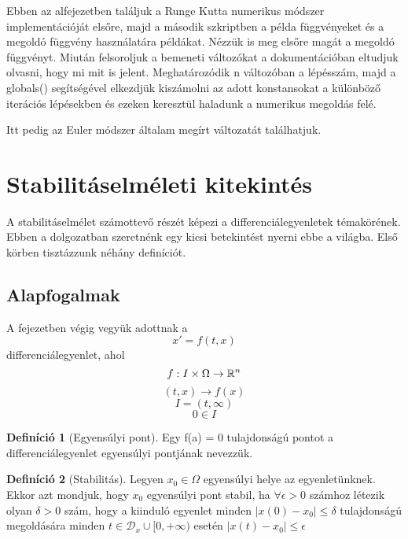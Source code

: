 \documentclass{article}
\theoremstyle{definition}
\theoremstyle{theorem}
\newtheorem{definition}{Definíció}
\begin{document}
Ebben az alfejezetben találjuk a Runge Kutta numerikus módszer implementációját elsőre, majd a második szkriptben a példa függvényeket és a megoldó függvény használatára példákat. Nézzük is meg elsőre magát a megoldó függvényt. Miután felsoroljuk a bemeneti változókat a dokumentációban eltudjuk olvasni, hogy mi mit is jelent. Meghatározódik n változóban a lépésszám, majd a globals() segítségével elkezdjük kiszámolni az adott konstansokat a különböző iterációs lépésekben és ezeken keresztül haladunk a numerikus megoldás felé.
\pagebreak



\pagebreak
Itt pedig az Euler módszer általam megírt változatát találhatjuk.

\section{Stabilitáselméleti kitekintés}
A stabilitáselmélet számottevő részét képezi a differenciálegyenletek témakörének. Ebben a dolgozatban szeretnénk egy kicsi betekintést nyerni ebbe a világba. Első körben tisztázzunk néhány definíciót.
\subsection{Alapfogalmak}
A fejezetben végig vegyük adottnak a
\begin{equation*}
    x' = f(t,x)
\end{equation*}
differenciálegyenlet, ahol
\begin{equation*}
    f: I \times \Omega \rightarrow \mathbb{R}^n \\
\end{equation*}
\begin{equation*}
    (t,x) \rightarrow f(x)
\end{equation*}
\begin{equation*}
    I=(t,\infty)
\end{equation*}
\begin{equation*}
    0 \in I
\end{equation*}
\begin{definition}[Egyensúlyi pont]
Egy f(a) = 0 tulajdonságú pontot a differenciálegyenlet egyensúlyi pontjának nevezzük.
\end{definition}
\begin{definition}[Stabilitás]
Legyen $x_0 \in \Omega$ egyensúlyi helye az egyenletünknek. Ekkor azt mondjuk, hogy $x_0$ egyensúlyi pont stabil, ha $\forall \epsilon > 0 $ számhoz létezik olyan $\delta > 0$ szám, hogy a kiinduló egyenlet minden $|x(0) - x_0| \leq \delta$ tulajdonságú megoldására minden $t \in \mathcal{D}_x \cup  [0, + \infty)$ esetén  $|x(t) - x_0| \leq \epsilon$
\end{definition}
\end{document}
